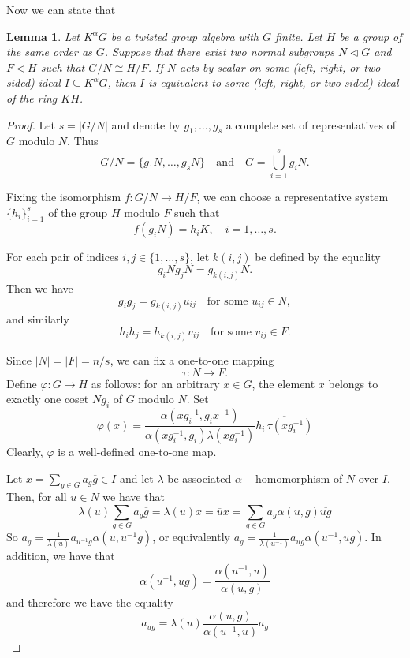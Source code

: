 \documentclass{article}
\newtheorem{lemma}[theorem]{Lemma}
\begin{document}
Now we can state that
\begin{lemma} \label{LemmaScalar}
    Let $K^\alpha G$ be a twisted group algebra with $G$ finite. Let $H$ be a group of the same order as $G$. Suppose that there exist two normal subgroups $N \triangleleft G$
and $F \triangleleft H$ such that $G/N \cong H/F$. If $N$ acts by scalar on some
(left, right, or two-sided) ideal $I \subseteq K^\alpha G$, then $I$ is
equivalent to some (left, right, or two-sided) ideal of the ring $KH$.
\end{lemma}
\begin{proof}
Let $s = |G/N|$ and denote by $g_1, \ldots, g_s$ a complete set of representatives
of $G$ modulo $N$. Thus
\[
G/N = \{ g_1N, \ldots, g_sN \}
\quad \text{and} \quad
G = \bigcup_{i=1}^s g_i N .
\]

Fixing the isomorphism $f \colon G/N \to H/F$, we can choose a representative
system $\{h_i\}_{i=1}^s$ of the group $H$ modulo $F$ such that
\[
f(g_iN) = h_iK, \quad i = 1, \ldots, s.
\]

For each pair of indices $i,j \in \{1, \ldots, s\}$, let $k(i,j)$ be defined by the
equality
\[
g_i N g_j N = g_{k(i,j)} N.
\]
Then we have
\[
g_i g_j = g_{k(i,j)} u_{ij} \quad \text{for some } u_{ij} \in N,
\]
and similarly
\[
h_i h_j = h_{k(i,j)} v_{ij} \quad \text{for some } v_{ij} \in F.
\]

Since $|N| = |F| = n/s$, we can fix a one-to-one mapping
\[
\tau \colon N \to F.
\]
Define $\varphi \colon G \to H$ as follows: for an arbitrary $x \in G$, the element
$x$ belongs to exactly one coset $Ng_i$ of $G$ modulo $N$. Set
\[
\varphi(x) = \frac{\alpha(xg_i^{-1}, g_i x^{-1})}{\alpha(xg_i^{-1}, g_i)\lambda(xg_i^{-1})}\overline{ h_i \, \tau( xg_i^{-1})}
\]
Clearly, $\varphi$ is a well-defined one-to-one map.

Let $x=\sum_{g\in G} a_g \overline{g} \in I$ and let $\lambda$ be associated $\alpha-$homomorphism of $N$ over $I$. Then, for all $u\in N$ we have that
     \begin{equation}
         \lambda(u)\sum_{g\in G} a_g \overline{g} =  \lambda(u)x = \overline{u}x = \sum_{g\in G} a_g \alpha(u,g) \overline{ug}
     \end{equation}
     So $a_g=\frac{1}{ \lambda(u)}a_{u^{-1}g }\alpha(u,u^{-1}g)$, or equivalently $a_g=\frac{1}{ \lambda(u^{-1})}a_{ug }\alpha(u^{-1},ug)$. In addition, we have that 
     \begin{equation}
         \alpha(u^{-1},ug) = \frac{\alpha(u^{-1},u)}{\alpha(u,g)}
     \end{equation}
     and therefore we have the equality
     \begin{equation}
         a_{ug} =  \lambda(u)\frac{\alpha(u,g)}{\alpha(u^{-1},u)} a_g
     \end{equation}


\end{proof}
\end{document}
